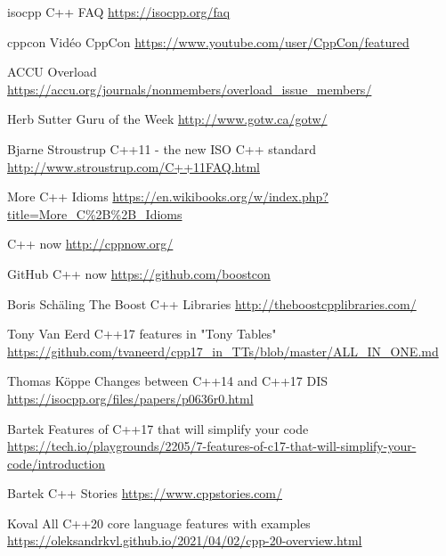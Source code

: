 \documentclass[C++.tex]{subfiles}
\begin{document}
\begin{frame}[allowframebreaks]
\begin{thebibliography}{1}
		isocpp
		\newblock C++ FAQ
		\newblock \url{https://isocpp.org/faq}

		cppcon
		\newblock Vidéo CppCon
		\newblock \url{https://www.youtube.com/user/CppCon/featured}

		ACCU
		\newblock Overload
		\newblock \url{https://accu.org/journals/nonmembers/overload_issue_members/}

		Herb Sutter
		\newblock Guru of the Week
		\newblock \url{http://www.gotw.ca/gotw/}

		Bjarne Stroustrup
		\newblock C++11 - the new ISO C++ standard
		\newblock \url{http://www.stroustrup.com/C++11FAQ.html}
			
		\newblock More C++ Idioms
		\newblock \url{https://en.wikibooks.org/w/index.php?title=More\_C\%2B\%2B\_Idioms}

		\newblock C++ now
		\newblock \url{http://cppnow.org/}

		\newblock GitHub C++ now
		\newblock \url{https://github.com/boostcon}

		Boris Schäling
		\newblock The Boost C++ Libraries
		\newblock \url{http://theboostcpplibraries.com/}

		Tony Van Eerd
		\newblock C++17 features in "Tony Tables"
		\newblock \url{https://github.com/tvaneerd/cpp17_in_TTs/blob/master/ALL_IN_ONE.md}

		Thomas Köppe
		\newblock Changes between C++14 and C++17 DIS
		\newblock \url{https://isocpp.org/files/papers/p0636r0.html}

		Bartek
		 Features of C++17 that will simplify your code
		\newblock \url{https://tech.io/playgrounds/2205/7-features-of-c17-that-will-simplify-your-code/introduction}

		Bartek
		\newblock C++ Stories
		\newblock \url{https://www.cppstories.com/}

		Koval
		\newblock All C++20 core language features with examples
		\newblock \url{https://oleksandrkvl.github.io/2021/04/02/cpp-20-overview.html}
	\end{thebibliography}
\end{frame}
\end{document}
